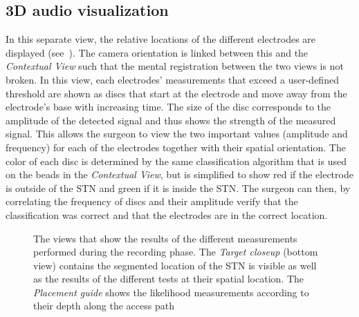 \subsection{3D audio visualization} \label{contributions:dbs:audio3d}
In this separate view, the relative locations of the different electrodes are displayed (see~). The camera orientation is linked between this and the \emph{Contextual View} such that the mental registration between the two views is not broken. In this view, each electrodes' measurements that exceed a user-defined threshold are shown as discs that start at the electrode and move away from the electrode's base with increasing time. The size of the disc corresponds to the amplitude of the detected signal and thus shows the strength of the measured signal. This allows the surgeon to view the two important values (amplitude and frequency) for each of the electrodes together with their spatial orientation. The color of each disc is determined by the same classification algorithm that is used on the beads in the \emph{Contextual View}, but is simplified to show red if the electrode is outside of the STN and green if it is inside the STN. The surgeon can then, by correlating the frequency of discs and their amplitude verify that the classification was correct and that the electrodes are in the correct location.

\begin{figure}
\caption{The views that show the results of the different measurements performed during the recording phase. The \emph{Target closeup} (bottom view) contains the segmented location of the STN is visible as well as the results of the different tests at their spatial location. The \emph{Placement guide} shows the likelihood measurements according to their depth along the access path}
\label{contributions:dbs:target}
\end{figure}

